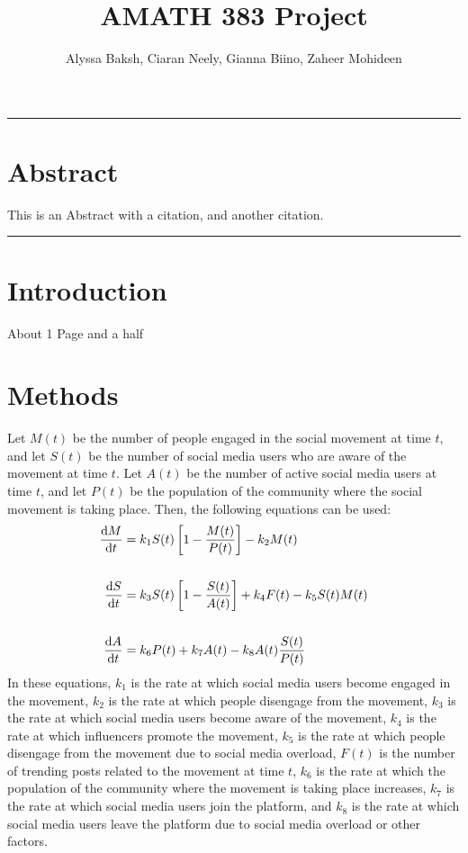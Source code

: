 \documentclass{article}
\title{AMATH 383 Project}
\author{
    Alyssa Baksh, 
    Ciaran Neely,
    Gianna Biino,
    Zaheer Mohideen
}
\begin{document}
    \maketitle
    
    \hrule
    \section{Abstract}
    This is an Abstract with a citation\cite{kaveh_defining_2020}, and another citation\cite{small_movements_2021}.
    \hrule
    \section{Introduction}
    About 1 Page and a half
    \section{Methods}
        Let $M(t)$ be the number of people engaged in the social movement at time $t$, and let $S(t)$ be the number of social media users who are aware of the movement at time $t$. Let $A(t)$ be the number of active social media users at time $t$, and let $P(t)$ be the population of the community where the social movement is taking place. Then, the following equations can be used:
        \begin{align}
            \diff Mt &= k_1 S(t) \left[1 - \frac{M(t)}{P(t)}\right] - k_2M(t)\\
            \nonumber\\
            \diff St &= k_3 S(t)\left[1 - \frac{S(t)}{A(t)}\right] + k_4 F(t) - k_5 S(t)M(t)\\
            \nonumber\\
            \diff At &= k_6 P(t) + k_7A(t) - k_8A(t)\frac{S(t)}{P(t)}
        \end{align}
        In these equations, $k_1$ is the rate at which social media users become engaged in the movement, $k_2$ is the rate at which people disengage from the movement, $k_3$ is the rate at which social media users become aware of the movement, $k_4$ is the rate at which influencers promote the movement, $k_5$ is the rate at which people disengage from the movement due to social media overload, $F(t)$ is the number of trending posts related to the movement at time $t$, $k_6$ is the rate at which the population of the community where the movement is taking place increases, $k_7$ is the rate at which social media users join the platform, and $k_8$ is the rate at which social media users leave the platform due to social media overload or other factors.
        
\end{document}

